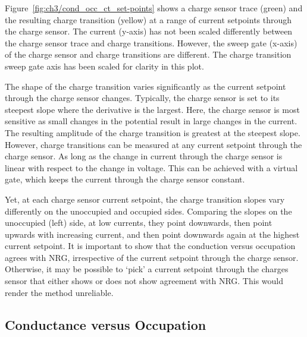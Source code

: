 Figure~\ref{fig:ch3/cond_occ_ct_set-points} shows a charge sensor trace (green) and the resulting charge transition (yellow) at a range of current setpoints through the charge sensor. The current (y-axis) has not been scaled differently between the charge sensor trace and charge transitions. However, the sweep gate (x-axis) of the charge sensor and charge transitions are different. The charge transition sweep gate axis has been scaled for clarity in this plot. 



The shape of the charge transition varies significantly as the current setpoint through the charge sensor changes. Typically, the charge sensor is set to its steepest slope where the derivative is the largest. Here, the charge sensor is most sensitive as small changes in the potential result in large changes in the current. The resulting amplitude of the charge transition is greatest at the steepest slope. However, charge transitions can be measured at any current setpoint through the charge sensor. As long as the change in current through the charge sensor is linear with respect to the change in voltage. This can be achieved with a virtual gate, which keeps the current through the charge sensor constant. 



Yet, at each charge sensor current setpoint, the charge transition slopes vary differently on the unoccupied and occupied sides. Comparing the slopes on the unoccupied (left) side, at low currents, they point downwards, then point upwards with increasing current, and then point downwards again at the highest current setpoint. It is important to show that the conduction versus occupation agrees with NRG, irrespective of the current setpoint through the charge sensor. Otherwise, it may be possible to `pick' a current setpoint through the charges sensor that either shows or does not show agreement with NRG. This would render the method unreliable. 




\subsection{Conductance versus Occupation}




